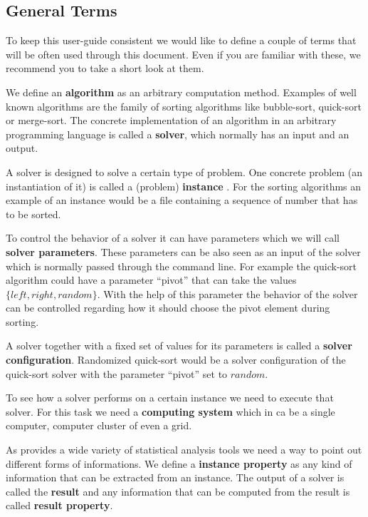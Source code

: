 
\subsection{General Terms}
To keep this user-guide consistent we would like to define a couple of terms that will be often used through this document. Even if you are familiar with these, we recommend you to take a short look at them.


 We define an \textbf{algorithm} as an arbitrary computation method.  Examples of well known algorithms are the family of sorting algorithms like bubble-sort, quick-sort or merge-sort.
 The concrete implementation of an algorithm in an arbitrary programming language is called a \textbf{solver}, which normally has an input and an output. 

A solver is designed to solve a certain type of problem. One concrete problem (an instantiation of it) is called a (problem) \textbf{instance} . For the sorting algorithms an example of an instance would be a file containing a sequence of number that has to be sorted.

 To control the behavior of a solver it can have parameters which we will call \textbf{solver parameters}. These parameters can be also seen as an input of the solver which is normally passed through the command line. For example the quick-sort algorithm could have a parameter ``pivot'' that can take the values $\{left,right,random\}$. With the help of this parameter the behavior of the solver can be controlled regarding how it should choose the pivot element during sorting. 

 A solver together with a fixed set of values for its parameters is called a \textbf{solver configuration}. Randomized quick-sort would be a solver configuration of the quick-sort solver with the parameter ``pivot'' set to $random$. 

 To see how a solver performs on a certain instance we need to execute that solver. For this task we need a \textbf{computing system} which in \edacc ca be a single computer, computer cluster of even a grid. 

As \edacc provides a wide variety of statistical analysis tools we need a way to point out different forms of informations.   We define a \textbf{instance property} as any kind of information that can be extracted from an instance.  The output of a solver is called the \textbf{result} and any information that can be computed from the result is called \textbf{result property}. 


